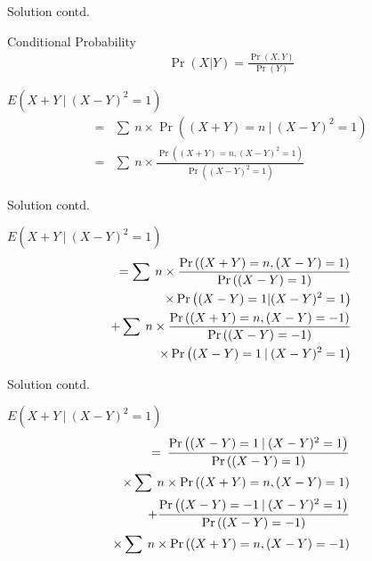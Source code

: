\documentclass{beamer}
\providecommand{\brak}[1]{\ensuremath{\left(#1\right)}}
\begin{document}
\begin{frame}{Solution contd.}
    \begin{block}{Conditional Probability}
        \begin{align}
            \Pr\brak{X|Y}=\frac{\Pr\brak{X,Y}}{\Pr\brak{Y}}
        \end{align}
    \end{block}
    \begin{block}{}
        $E\brak{X+Y\:|\:(X-Y)^2=1}$
        \begin{align}
            =&\sum\:n\times\Pr\brak{(X+Y)=n\:|\:(X-Y)^2=1}\\
            =&\sum\:n\times\frac{\Pr\brak{(X+Y)=n,(X-Y)^2=1}}{\Pr\brak{(X-Y)^2=1}}
        \end{align}
    \end{block}
\end{frame}
\begin{frame}{Solution contd.}
    \begin{block}{}
        $E\brak{X+Y\:|\:(X-Y)^2=1}$
        \begin{align}
            \begin{split}
                =\sum\:n\times\frac{\Pr\brak{(X+Y)=n,(X-Y)=1}}{\Pr\brak{(X-Y)=1}}
                \bigskip\\
                \times\Pr\brak{(X-Y)=1|(X-Y)^2=1}
                \bigskip\\
                +\sum\:n\times\frac{\Pr\brak{(X+Y)=n,(X-Y)=-1}}{\Pr\brak{(X-Y)=-1}}
                \bigskip\\
                \times\Pr\brak{(X-Y)=1\:|\:(X-Y)^2=1}
            \end{split}
        \end{align}
    \end{block}
\end{frame}
\begin{frame}{Solution contd.}
    \begin{block}{}
        $E\brak{X+Y\:|\:(X-Y)^2=1}$
        \begin{align}
            \begin{split}
                =\:\frac{\Pr\brak{(X-Y)=1\:|\:(X-Y)^2=1}}{\Pr\brak{(X-Y)=1}}
                \bigskip\\
                \times\sum\:n\times\Pr\brak{(X+Y)=n,(X-Y)=1}
                \bigskip\\
                +\frac{\Pr\brak{(X-Y)=-1\:|\:(X-Y)^2=1}}{\Pr\brak{(X-Y)=-1}}
                \bigskip\\
                \times\sum\:n\times\Pr\brak{(X+Y)=n,(X-Y)=-1}\label{0.0.24}
            \end{split}
        \end{align}
    \end{block}
\end{frame}
\end{document}
